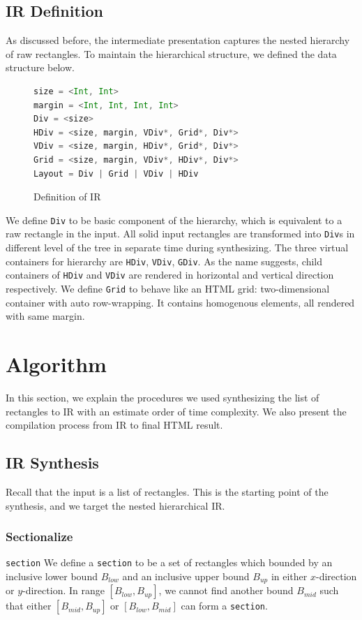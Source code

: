 \documentclass[runningheads]{llncs}
\begin{document}
\subsection{IR Definition}
As discussed before, the intermediate presentation captures the nested hierarchy of raw rectangles. To maintain the hierarchical structure, we defined the data structure below.
\begin{figure}[H]
\vspace*{-0.2in}
\begin{lstlisting}[language=Scala,mathescape=true]
size = <Int, Int>
margin = <Int, Int, Int, Int>
Div = <size>
HDiv = <size, margin, VDiv*, Grid*, Div*>
VDiv = <size, margin, HDiv*, Grid*, Div*>
Grid = <size, margin, VDiv*, HDiv*, Div*>
Layout = Div | Grid | VDiv | HDiv
\end{lstlisting}
\caption{Definition of IR}
\end{figure}
We define \lstinline|Div| to be basic component of the hierarchy, which is equivalent to a raw rectangle in the input. All solid input rectangles are transformed into \lstinline|Div|s in different level of the tree in separate time during synthesizing. The three virtual containers for hierarchy are   \lstinline|HDiv|, \lstinline|VDiv|, \lstinline|GDiv|. As the name suggests, child containers of \lstinline|HDiv| and \lstinline|VDiv| are rendered in horizontal and vertical direction respectively. We define \lstinline|Grid| to behave like an HTML grid: two-dimensional container with auto row-wrapping. It contains homogenous elements, all rendered with same margin.


\section{Algorithm}
In this section, we explain the procedures we used synthesizing the list of rectangles to IR with an estimate order of time complexity. We also present the compilation process from IR to final HTML result.
\subsection{IR Synthesis}
Recall that the input is a list of rectangles. This is the starting point of the synthesis, and we target the nested hierarchical IR. 

\subsubsection{Sectionalize} 
\begin{definition}{\lstinline{section}}
  We define a \lstinline{section} to be a set of rectangles which bounded by an inclusive lower bound $B_{low}$ and an inclusive upper bound $B_{up}$ in either $x$-direction or $y$-direction. In range $[B_{low}, B_{up}]$, we cannot find another bound $B_{mid}$ such that either $[B_{mid}, B_{up}]$ or $[B_{low}, B_{mid}]$ can form a \lstinline{section}.
\end{definition}
\end{document}
